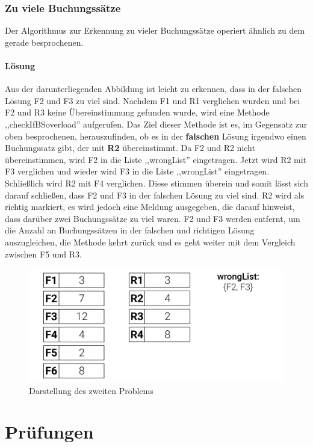 \documentclass[12pt]{report}
\begin{document}
  
\subsection{Zu viele Buchungssätze}
Der Algorithmus zur Erkennung zu vieler Buchungssätze operiert ähnlich zu dem gerade besprochenen.
 
\subsubsection{Lösung}
Aus der darunterliegenden Abbildung ist leicht zu erkennen, dass in der falschen Lösung F2 und F3 zu viel sind. Nachdem F1 und R1 verglichen wurden und bei F2 und R3 keine Übereinstimmung gefunden wurde, wird eine Methode ,,checkIfBSoverload'' aufgerufen. Das Ziel dieser Methode ist es, im Gegensatz zur oben besprochenen, herauszufinden, ob es in der \textbf{falschen} Lösung irgendwo einen Buchungssatz gibt, der mit \textbf{R2} übereinstimmt. Da F2 und R2 nicht übereinstimmen, wird F2 in die Liste ,,wrongList'' eingetragen. Jetzt wird R2 mit F3 verglichen und wieder wird F3 in die Liste ,,wrongList'' eingetragen. Schließlich wird R2 mit F4 verglichen. Diese stimmen überein und somit lässt sich darauf schließen, dass F2 und F3 in der falschen Lösung zu viel sind. R2 wird als richtig markiert, es wird jedoch eine Meldung ausgegeben, die darauf hinweist, dass darüber zwei Buchungssätze zu viel waren. F2 und F3 werden entfernt, um die Anzahl an Buchungssätzen in der falschen und richtigen Lösung auszugleichen, die Methode kehrt zurück und es geht weiter mit dem Vergleich zwischen F5 und R3.
 
 
\begin{figure}[h]
	\centering
	\includegraphics[height=5cm]{images/BSoverload}
	\caption[Problem zu viele Buchungssätze]{Darstellung des zweiten Problems}
\end{figure}
  
  
  
\chapter{Prüfungen}
\lhead{\thepage}
 
\end{document}
